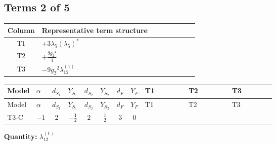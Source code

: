 \documentclass[8pt]{article}
\begin{document}
\begin{landscape}
\subsection*{Terms 2 of 5}
\begin{center}
\begin{tabular}{@{}c >{\raggedright\arraybackslash}p{0.82\linewidth}@{}}
\toprule
Column & Representative term structure \\
\midrule
T1 & \(\displaystyle +3 {\lambda_5} \left({\lambda_5}\right)^{*}\) \\
\midrule
T2 & \(\displaystyle +\frac{9 {g_2}^4}{4}\) \\
\midrule
T3 & \(\displaystyle -9 {g_2}^2 {\lambda_{12}^{(1)}}\) \\
\midrule
\bottomrule
\end{tabular}
\end{center}
\smallskip
\tiny
\begin{longtable}{@{}llcccccc >{\raggedright\arraybackslash}p{0.21\linewidth} >{\raggedright\arraybackslash}p{0.21\linewidth} >{\raggedright\arraybackslash}p{0.21\linewidth}@{}}
\toprule
Model & $\alpha$ & $d_{S_1}$ & $Y_{S_1}$ & $d_{S_2}$ & $Y_{S_2}$ & $d_F$ & $Y_F$ & T1 & T2 & T3 \\
\midrule
\endfirsthead
\toprule
Model & $\alpha$ & $d_{S_1}$ & $Y_{S_1}$ & $d_{S_2}$ & $Y_{S_2}$ & $d_F$ & $Y_F$ & T1 & T2 & T3 \\
\midrule
\endhead
T3-C & $-1$ & $2$ & $-\frac{1}{2}$ & $2$ & $\frac{1}{2}$ & $3$ & $0$ & \scriptsize\adjustbox{max width=\linewidth}{$\begin{gathered} +3 {\lambda_5} \left({\lambda_5}\right)^{*}\end{gathered}$} & \scriptsize\adjustbox{max width=\linewidth}{$\begin{gathered} +\frac{9 {g_2}^4}{4}\end{gathered}$} & \scriptsize\adjustbox{max width=\linewidth}{$\begin{gathered} -9 {g_2}^2 {\lambda_{12}^{(1)}}\end{gathered}$} \\
\midrule
\bottomrule
\end{longtable}
\clearpage
\noindent\textbf{Quantity: }$\lambda_{12}^{(1)}$\par\smallskip

\end{landscape}
\end{document}
